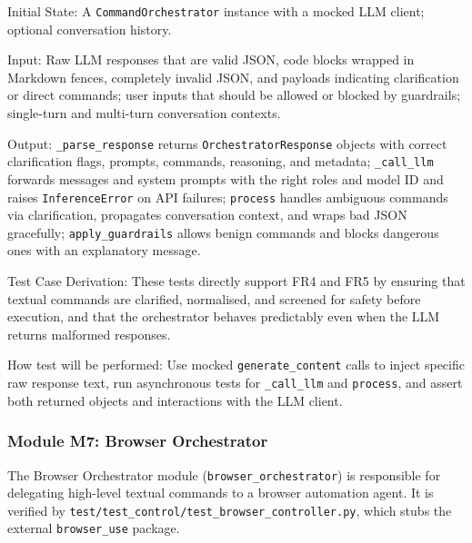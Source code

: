 \documentclass[12pt, titlepage]{article}
\begin{document}
\begin{enumerate}
Initial State: A \texttt{CommandOrchestrator} instance with a mocked LLM client; optional conversation history.

Input: Raw LLM responses that are valid JSON, code blocks wrapped in Markdown fences, completely invalid JSON, and payloads indicating clarification or direct commands; user inputs that should be allowed or blocked by guardrails; single-turn and multi-turn conversation contexts.

Output: \texttt{\_parse\_response} returns \texttt{OrchestratorResponse} objects with correct clarification flags, prompts, commands, reasoning, and metadata; \texttt{\_call\_llm} forwards messages and system prompts with the right roles and model ID and raises \texttt{InferenceError} on API failures; \texttt{process} handles ambiguous commands via clarification, propagates conversation context, and wraps bad JSON gracefully; \texttt{apply\_guardrails} allows benign commands and blocks dangerous ones with an explanatory message.

Test Case Derivation: These tests directly support FR4 and FR5 by ensuring that textual commands are clarified, normalised, and screened for safety before execution, and that the orchestrator behaves predictably even when the LLM returns malformed responses.

How test will be performed: Use mocked \texttt{generate\_content} calls to inject specific raw response text, run asynchronous tests for \texttt{\_call\_llm} and \texttt{process}, and assert both returned objects and interactions with the LLM client.
\end{enumerate}

\subsubsection{Module M7: Browser Orchestrator}

The Browser Orchestrator module (\texttt{browser\_orchestrator}) is responsible for delegating high-level textual commands to a browser automation agent. It is verified by \texttt{test/test\_control/test\_browser\_controller.py}, which stubs the external \texttt{browser\_use} package.
\end{document}
